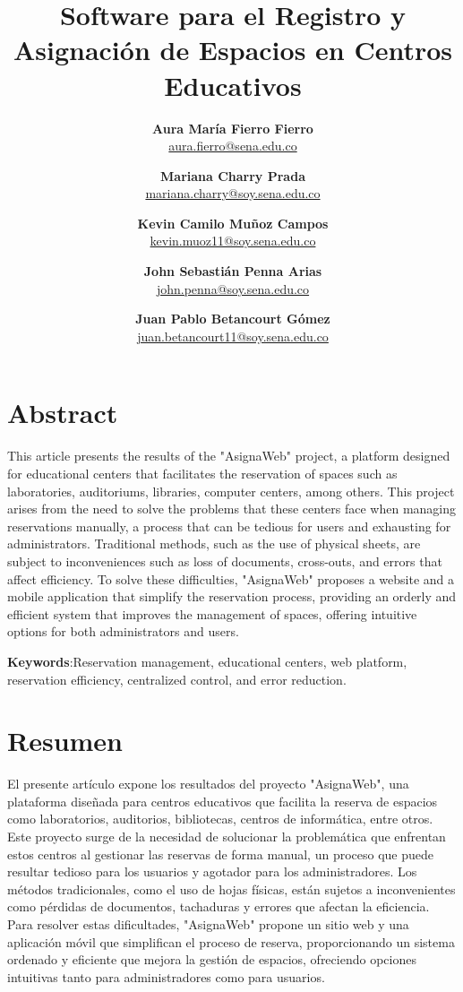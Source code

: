 \documentclass[12pt,a4paper]{article}
\title{\textbf{Software para el Registro y Asignación de Espacios en Centros Educativos}}
\author{
    \textbf{Aura María Fierro Fierro} \\ \href{mailto:aura.fierro@sena.edu.co}{aura.fierro@sena.edu.co} \and
    \textbf{Mariana Charry Prada} \\ \href{mailto:mariana.charry@soy.sena.edu.co}{mariana.charry@soy.sena.edu.co} \and
    \textbf{Kevin Camilo Muñoz Campos} \\ \href{mailto:kevin.muoz11@soy.sena.edu.co}{kevin.muoz11@soy.sena.edu.co} \and
    \textbf{John Sebastián Penna Arias} \\ \href{mailto:john.penna@soy.sena.edu.co}{john.penna@soy.sena.edu.co} \and
    \textbf{Juan Pablo Betancourt Gómez} \\ \href{mailto:juan.betancourt11@soy.sena.edu.co}{juan.betancourt11@soy.sena.edu.co}
}
\date{}
\begin{document}
\maketitle

\begin{multicols}{2}

\section*{Abstract}
This article presents the results of the "AsignaWeb" project, a platform designed for educational centers that facilitates the reservation of spaces such as laboratories, auditoriums, libraries, computer centers, among others. This project arises from the need to solve the problems that these centers face when managing reservations manually, a process that can be tedious for users and exhausting for administrators. Traditional methods, such as the use of physical sheets, are subject to inconveniences such as loss of documents, cross-outs, and errors that affect efficiency. To solve these difficulties, "AsignaWeb" proposes a website and a mobile application that simplify the reservation process, providing an orderly and efficient system that improves the management of spaces, offering intuitive options for both administrators and users.

\textbf{Keywords}:Reservation management, educational centers, web platform, reservation efficiency, centralized control, and error reduction.

\section*{Resumen}
El presente artículo expone los resultados del proyecto "AsignaWeb", una plataforma diseñada para centros educativos que facilita la reserva de espacios como laboratorios, auditorios, bibliotecas, centros de informática, entre otros. Este proyecto surge de la necesidad de solucionar la problemática que enfrentan estos centros al gestionar las reservas de forma manual, un proceso que puede resultar tedioso para los usuarios y agotador para los administradores. Los métodos tradicionales, como el uso de hojas físicas, están sujetos a inconvenientes como pérdidas de documentos, tachaduras y errores que afectan la eficiencia. Para resolver estas dificultades, "AsignaWeb" propone un sitio web y una aplicación móvil que simplifican el proceso de reserva, proporcionando un sistema ordenado y eficiente que mejora la gestión de espacios, ofreciendo opciones intuitivas tanto para administradores como para usuarios.


\end{multicols}
\end{document}
